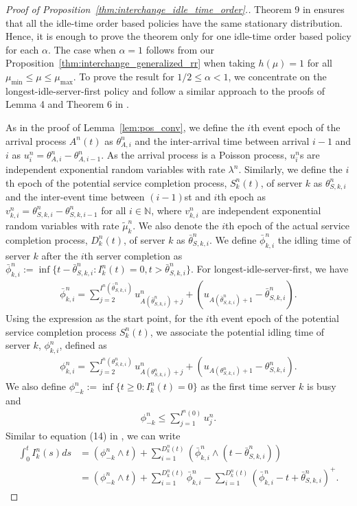 \documentclass[a4paper,11pt,twoside]{article}
\numberwithin{equation}{section}
\numberwithin{figure}{section}
\theoremstyle{plain}
\newcommand{\NN}{\mathbb{N}}
\newcommand{\1}{\mathbbm{1}}
\begin{document}
\begin{proof}[Proof of Proposition~\ref{thm:interchange_idle_time_order}.]
Theorem 9 in \cite{Gopalakrishnan_etal2016} ensures that all the idle-time order based policies have the same stationary distribution. Hence, it is enough to prove the theorem only for one idle-time order based policy for each $\alpha$. The case when $\alpha=1$ follows from our Proposition~\ref{thm:interchange_generalized_rr} when taking $h(\mu)=1$ for all $\mu_{\min}\leq \mu\leq \mu_{\max}$. To prove the result for $1/2\leq \alpha<1$, we concentrate on the longest-idle-server-first policy and follow a similar approach to the proofs of Lemma 4 and Theorem 6 in \cite{bukeqin2019}. 

As in the proof of Lemma~\ref{lem:pos_conv}, we define the $i$th event epoch of the arrival process $A^n(t)$ as $\theta_{A,i}^n$ and the inter-arrival time between arrival $i-1$ and $i$ as $u_{i}^n=\theta_{A, i}^n-\theta_{A,i-1}^n$. As the arrival process is a Poisson process, $u_i^n$s are independent exponential random variables with rate $\lambda^n$. Similarly, we define the $i$th epoch of the potential service completion process, $S_k^n(t)$, of server $k$ as $\theta_{S,k,i}^n$ and the inter-event time between $(i-1)$st and $i$th epoch as $v_{k,i}^n=\theta_{S,k,i}^n-\theta_{S,k,i-1}^n$ for all $i\in \NN$, where $v_{k,i}^n$ are independent exponential random variables with rate $\tilde{\mu}_{k}^n$.  We also denote the $i$th epoch of the actual service completion process, $D_k^n(t)$, of server $k$ as $\bar{\theta}_{S,k,i}^n$. We define $\bar{\phi}_{k,i}^n$ the idling time of server $k$ after the $i$th server completion as $\bar{\phi}_{k,i}^n:=\inf\{t-\bar{\theta}_{S,k,i}^n:I_k^n(t)=0, t>\bar{\theta}_{S,k,i}^n\}$. For longest-idle-server-first, we have 
\begin{align*}
    \bar{\phi}_{k,i}^n=\sum_{j=2}^{I^n(\bar{\theta}_{S,k,i}^n)}u_{A(\bar{\theta}_{S,k,i}^n)+j}^n+(u_{A(\bar{\theta}_{S,k,i}^n)+1}-\bar{\theta}_{S, k,i}^n).
\end{align*}
Using the expression as the start point, for the $i$th event epoch of the potential service completion process $S_k^n(t)$, we associate the potential idling time of server $k$, $\phi_{k,i}^n$, defined as 
\begin{align*}
    \phi_{k,i}^n=\sum_{j=2}^{I^n(\theta_{S,k,i}^n)}u_{A(\theta_{S,k,i}^n)+j}^n+(u_{A(\theta_{S,k,i}^n)+1}-\theta_{S,k,i}^n).
\end{align*}
We also define $\phi_{-k}^n:=\inf\{t\geq 0:I_{k}^n(t)=0\}$ as the first time server $k$ is busy and 
\begin{align*}
    \phi_{-k}^n\leq \sum_{j=1}^{I^n(0)}u_{j}^n.
\end{align*} 
Similar to equation (14) in \cite{bukeqin2019}, we can write 
\begin{align}
    \nonumber\int_0^t I_k^n(s)ds&=(\phi_{-k}^n\wedge t)+\sum_{i=1}^{D_k^n(t)}(\bar{\phi}_{k,i}^n \wedge (t-\bar{\theta}_{S,k,i}^n))\\
    &=(\phi_{-k}^n\wedge t)+\sum_{i=1}^{D_k^n(t)}\bar{\phi}_{k,i}^n - \sum_{i=1}^{D_k^n(t)}(\bar{\phi}_{k,i}^n - t+\bar{\theta}_{S,k,i}^n)^+.\label{eq:idle_expansion}
\end{align}


\end{proof}
\end{document}
